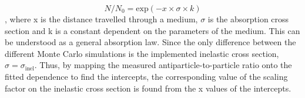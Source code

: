 \begin{equation}\label{eq:LambertBeer}
    N/N_0 = \mathrm{exp}\left( -x\times \sigma \times k \right)
\end{equation}
, where x is the distance travelled through a medium, $\sigma$ is the absorption cross section and k is a constant dependent on the parameters of the medium. This can be understood as a general absorption law. Since the only difference between the different Monte Carlo simulations is the implemented inelastic cross section, $\sigma = \sigma_\mathrm{inel}$. Thus, by mapping the measured antiparticle-to-particle ratio onto the fitted dependence to find the intercepts, the corresponding value of the scaling factor on the inelastic cross section is found from the x values of the intercepts. \\

